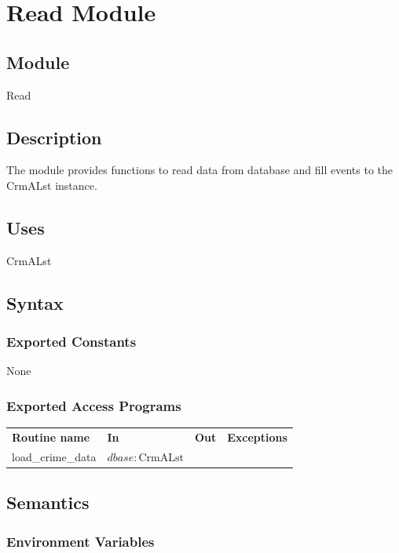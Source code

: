 \documentclass[12pt]{article}
\begin{document}
\newpage

\section* {Read Module}

\subsection* {Module}

Read

\subsection* {Description}
The module provides functions to read data from database and fill events to the CrmALst instance.

\subsection* {Uses}

CrmALst

\subsection* {Syntax}

\subsubsection* {Exported Constants}

None

\subsubsection* {Exported Access Programs}

\begin{tabular}{| l | l | l | l |}
\hline
\textbf{Routine name} & \textbf{In} & \textbf{Out} & \textbf{Exceptions}\\
load\_crime\_data & $dbase: \mbox{CrmALst}$ & ~ & ~\\
\hline
\end{tabular}

\subsection* {Semantics}

\subsubsection* {Environment Variables}
\end{document}
